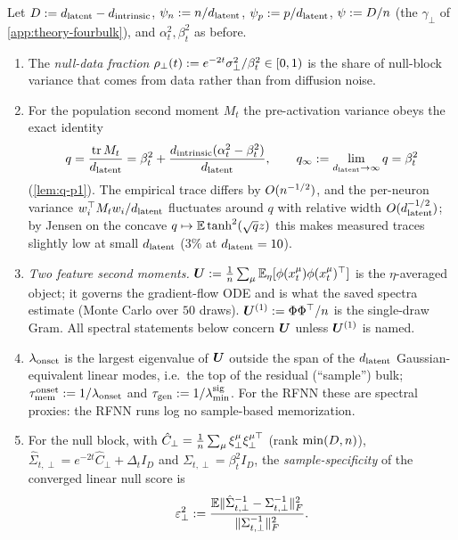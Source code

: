 \begin{definition}\label{def:scope-ratios}
Let $D:=d_{\mathrm{latent}}-d_{\mathrm{intrinsic}}$, $\psi_n:=n/d_{\mathrm{latent}}$, $\psi_p:=p/d_{\mathrm{latent}}$, $\psi:=D/n$ (the $\gamma_\perp$ of \cref{app:theory-fourbulk}), and $\alpha_t^2,\beta_t^2$ as before.
\begin{enumerate}
\item[(i)] The \emph{null-data fraction} $\rho_\perp(t):=e^{-2t}\sigma_{\perp}^2/\beta_t^2\in[0,1)$ is the share of null-block variance that comes from data rather than from diffusion noise.
\item[(ii)] For the population second moment $M_t$ the pre-activation variance obeys the exact identity
\begin{equation}\label{eq:scope-q}
q=\frac{\operatorname{tr}M_t}{d_{\mathrm{latent}}}=\beta_t^2+\frac{d_{\mathrm{intrinsic}}(\alpha_t^2-\beta_t^2)}{d_{\mathrm{latent}}},\qquad q_\infty:=\lim_{d_{\mathrm{latent}}\to\infty}q=\beta_t^2
\end{equation}
(\cref{lem:q-p1}). The empirical trace differs by $O(n^{-1/2})$, and the per-neuron variance $w_i^\top M_tw_i/d_{\mathrm{latent}}$ fluctuates around $q$ with relative width $O(d_{\mathrm{latent}}^{-1/2})$; by Jensen on the concave $q\mapsto\mathbb{E}\tanh^2(\sqrt qz)$ this makes measured traces slightly low at small $d_{\mathrm{latent}}$ ($3\%$ at $d_{\mathrm{latent}}=10$).
\item[(iii)] \emph{Two feature second moments.} $\bm{U}:=\frac1{n}\sum_\mu\mathbb{E}_\eta[\phi(x_t^\mu)\phi(x_t^\mu)^\top]$ is the $\eta$-averaged object; it governs the gradient-flow ODE and is what the saved spectra estimate (Monte Carlo over $50$ draws). $\bm{U}^{(1)}:=\Phi\Phi^\top/n$ is the single-draw Gram. All spectral statements below concern $\bm{U}$ unless $\bm{U}^{(1)}$ is named.
\item[(iv)] $\lambda_{\rm onset}$ is the largest eigenvalue of $\bm{U}$ outside the span of the $d_{\mathrm{latent}}$ Gaussian-equivalent linear modes, i.e.\ the top of the residual (``sample'') bulk; $\tau_{\mathrm{mem}}^{\rm onset}:=1/\lambda_{\rm onset}$ and $\tau_{\mathrm{gen}}:=1/\lambda^{\rm sig}_{\min}$. For the RFNN these are spectral proxies: the RFNN runs log no sample-based memorization.
\item[(v)] For the null block, with $\hat C_\perp=\frac1{n}\sum_\mu\xi^\mu_\perp\xi^{\mu\top}_\perp$ (rank $\min(D,n)$), $\hat\Sigma_{t,\perp}=e^{-2t}\hat C_\perp+\Delta_t I_D$ and $\Sigma_{t,\perp}=\beta_t^2I_D$, the \emph{sample-specificity} of the converged linear null score is
\begin{equation}\label{eq:scope-epsdef}
\varepsilon_\perp^2:=\frac{\mathbb{E}\|\hat\Sigma_{t,\perp}^{-1}-\Sigma_{t,\perp}^{-1}\|_F^2}{\|\Sigma_{t,\perp}^{-1}\|_F^2}.
\end{equation}
\end{enumerate}
\end{definition}

